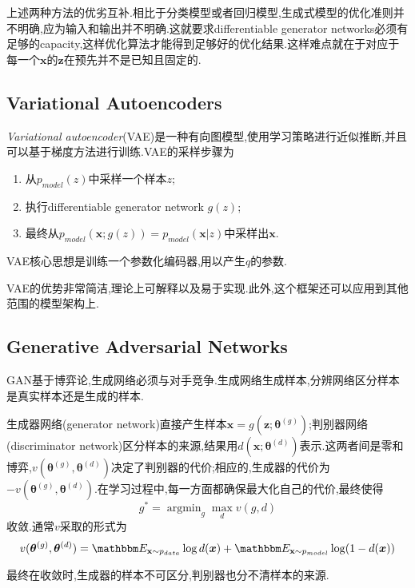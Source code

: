 上述两种方法的优劣互补.相比于分类模型或者回归模型,生成式模型的优化准则并不明确,应为输入和输出并不明确.这就要求differentiable generator networks必须有足够的capacity,这样优化算法才能得到足够好的优化结果.这样难点就在于对应于每一个$\bm x$的$\bm z$在预先并不是已知且固定的.

\subsection{Variational Autoencoders}

\textit{Variational autoencoder}(VAE)是一种有向图模型,使用学习策略进行近似推断,并且可以基于梯度方法进行训练.VAE的采样步骤为
\begin{enumerate}
    \item 从$p_{model}(z)$中采样一个样本$z$;
    \item 执行differentiable generator network $g(z)$;
    \item 最终从$p_{model}(\bm x;g(z))=p_{model}(\bm x|z)$中采样出$\bm x$.
\end{enumerate}

VAE核心思想是训练一个参数化编码器,用以产生$q$的参数.

VAE的优势非常简洁,理论上可解释以及易于实现.此外,这个框架还可以应用到其他范围的模型架构上.

\subsection{Generative Adversarial Networks}

GAN基于博弈论,生成网络必须与对手竞争.生成网络生成样本,分辨网络区分样本是真实样本还是生成的样本.

生成器网络(generator network)直接产生样本$\bm x=g(\bm z;\bm\theta^{(g)})$;判别器网络(discriminator network)区分样本的来源,结果用$d(\bm x;\bm\theta^{(d)})$表示.这两者间是零和博弈,$v(\bm\theta^{(g)},\bm\theta^{(d)})$决定了判别器的代价;相应的,生成器的代价为$-v(\bm\theta^{(g)},\bm\theta^{(d)})$.在学习过程中,每一方面都确保最大化自己的代价,最终使得
\begin{equation}
g^\ast=\mathop{\arg\min}_g\max_dv(g,d)
\end{equation}
收敛.通常$v$采取的形式为
\begin{equation}
v(\bm\theta^{(g)},\bm\theta^{(d)})=\mathbbm E_{\mathbf x\sim p_{data}}\log d(\bm x)+\mathbbm E_{\mathbf x\sim p_{model}}\log (1-d(\bm x))
\end{equation}

最终在收敛时,生成器的样本不可区分,判别器也分不清样本的来源.

